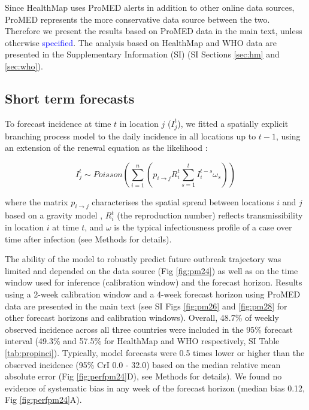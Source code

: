\documentclass[9pt,twocolumn,twoside,lineno]{pnas-new}
\newcommand{\sangeeta}[1]{\textcolor{blue}{#1}}
\begin{document}
Since HealthMap uses ProMED alerts in addition to other online data
sources, ProMED represents the more conservative data source between the
two. Therefore we present the results based on ProMED data in the main
text, unless otherwise \sangeeta{specified}. The analysis based on HealthMap and
WHO data are presented in the
Supplementary Information (SI) (SI Sections \ref{sec:hm}
and \ref{sec:who}).


\subsection*{Short term forecasts}\label{short-term-forecasts}

To forecast incidence at time \(t\) in location \(j\) (\(I_{j}^{t}\)),
we fitted a spatially explicit branching process model to the daily
incidence in all locations up to \(t - 1\), using an extension of the
renewal equation as the likelihood \cite{fraser2007estimating}:

\begin{equation}
I_{j}^{t} \sim Poisson\left(\sum_{i = 1}^n\left({p_{i \rightarrow j} R_{i}^{t}
\sum_{s = 1}^t{I_{i}^{t - s} \omega_s}}\right)\right)
\label{eq:model}
\end{equation}

where the matrix \(p_{i \rightarrow j}\) characterises the spatial
spread between locations \(i\) and \(j\) based on a gravity model
\cite{zipf1946p}, \(R_{i}^{t}\) (the reproduction number) reflects
transmissibility in location \(i\) at time \(t\), and \(\omega\) is the
typical infectiousness profile of a case over time after infection (see
Methods for details).

The ability of the model to robustly predict future outbreak
trajectory was limited and depended on the data source (Fig \ref{fig:pm24})
as well as on the time window used for inference (calibration window)
and the forecast horizon. Results using a 2-week calibration window
and a 4-week forecast horizon using ProMED data are presented in
the main text (see SI Figs \ref{fig:pm26} and \ref{fig:pm28} for other 
forecast horizons and calibration windows).
Overall, 48.7\% of weekly observed incidence across
all three countries were included in the 95\%
forecast interval (49.3\% and 57.5\% for HealthMap and WHO
respectively, SI Table \ref{tab:propinci}).
Typically, model forecasts were 0.5 times lower or higher
than the observed incidence (95\% CrI 0.0 - 32.0) based on the 
median relative mean absolute
error (Fig \ref{fig:perfpm24}D), see Methods for details). We found no evidence of
systematic bias in any week of the forecast horizon (median bias 0.12,
Fig \ref{fig:perfpm24}A).
\end{document}

